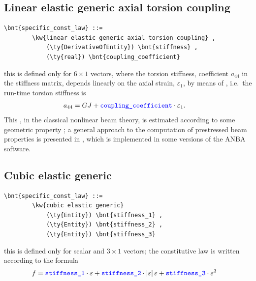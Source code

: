 \subsection{Linear elastic generic axial torsion coupling}
\label{sec:ConstitutiveLaw:LINEAR-ELASTIC-GENERIC-AXIAL-TORSION-COUPLING}
\begin{Verbatim}[commandchars=\\\{\}]
    \bnt{specific_const_law} ::= 
        \kw{linear elastic generic axial torsion coupling} ,
            (\ty{DerivativeOfEntity}) \bnt{stiffness} ,
            (\ty{real}) \bnt{coupling_coefficient}
\end{Verbatim}
this is defined only for $6 \times 1$ vectors, where the torsion stiffness,
coefficient $ a_{44} $ in the stiffness matrix, depends linearly on 
the axial strain, $ \varepsilon_1 $, by means of 
, i.e.\ the run-time torsion stiffness is 
\begin{align}
	a_{44}
	&=
	GJ + \textcolor{blue}{\texttt{coupling\_coefficient}} \cdot \varepsilon_1 .
\end{align}
This , in the classical nonlinear beam theory,
is estimated according to some geometric property \cite{HOUBOLT-BROOKS-1957};
a general approach to the computation of prestressed beam properties
is presented in \cite{BORRI-MERLINI}, which is implemented in some versions
of the ANBA software.

\subsection{Cubic elastic generic}
\begin{Verbatim}[commandchars=\\\{\}]
    \bnt{specific_const_law} ::= 
        \kw{cubic elastic generic}
            (\ty{Entity}) \bnt{stiffness_1} ,
            (\ty{Entity}) \bnt{stiffness_2} ,
            (\ty{Entity}) \bnt{stiffness_3}
\end{Verbatim}
this is defined only for scalar and $3 \times 1$ vectors; the constitutive
law is written according to the formula
\begin{align}
	f
	&=
	\textcolor{blue}{\texttt{stiffness\_1}} \cdot \varepsilon
	+ \textcolor{blue}{\texttt{stiffness\_2}} \cdot \left| \varepsilon \right|\varepsilon
	+ \textcolor{blue}{\texttt{stiffness\_3}} \cdot \varepsilon^3
\end{align}
%

